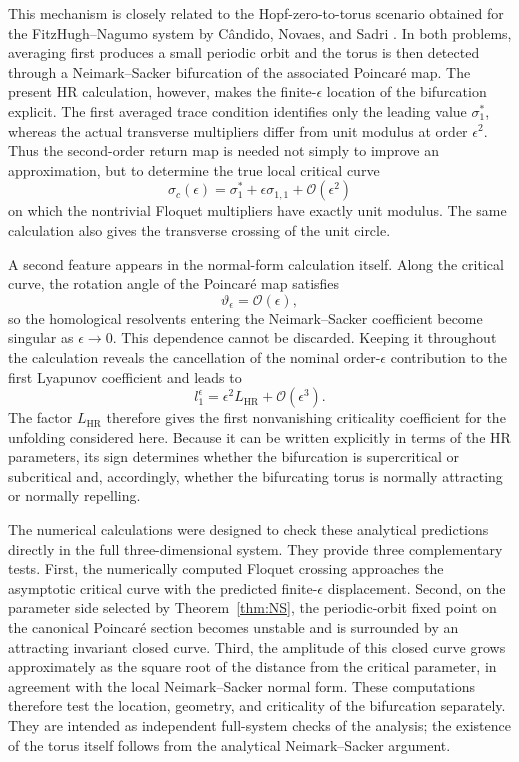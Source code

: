 \documentclass[11pt]{amsart}
\theoremstyle{remark}
\begin{document}
This mechanism is closely related to the Hopf-zero-to-torus scenario
obtained for the FitzHugh--Nagumo system by C\^andido, Novaes, and
Sadri \cite{candido2027invariant}. In both problems, averaging first
produces a small periodic orbit and the torus is then detected through a
Neimark--Sacker bifurcation of the associated Poincar\'e map. The
present HR calculation, however, makes the finite-$\epsilon$ location of
the bifurcation explicit. The first averaged trace condition identifies
only the leading value $\sigma_1^*$, whereas the actual transverse
multipliers differ from unit modulus at order $\epsilon^2$. Thus the
second-order return map is needed not simply to improve an
approximation, but to determine the true local critical curve
\[
\sigma_c(\epsilon)
=
\sigma_1^*+\epsilon\sigma_{1,1}
+\mathcal{O}(\epsilon^2)
\]
on which the nontrivial Floquet multipliers have exactly unit modulus.
The same calculation also gives the transverse crossing of the unit
circle.

A second feature appears in the normal-form calculation itself. Along
the critical curve, the rotation angle of the Poincar\'e map satisfies
\[
\vartheta_\epsilon=\mathcal{O}(\epsilon),
\]
so the homological resolvents entering the Neimark--Sacker coefficient
become singular as $\epsilon\to0$. This dependence cannot be discarded.
Keeping it throughout the calculation reveals the cancellation of the
nominal order-$\epsilon$ contribution to the first Lyapunov coefficient
and leads to
\[
l_1^\epsilon
=
\epsilon^2L_{\mathrm{HR}}
+\mathcal{O}(\epsilon^3).
\]
The factor $L_{\mathrm{HR}}$ therefore gives the first nonvanishing
criticality coefficient for the unfolding considered here. Because it
can be written explicitly in terms of the HR parameters, its sign
determines whether the bifurcation is supercritical or subcritical and,
accordingly, whether the bifurcating torus is normally attracting or
normally repelling.

The numerical calculations were designed to check these analytical
predictions directly in the full three-dimensional system. They provide
three complementary tests. First, the numerically computed Floquet
crossing approaches the asymptotic critical curve with the predicted
finite-$\epsilon$ displacement. Second, on the parameter side selected
by Theorem~\ref{thm:NS}, the periodic-orbit fixed point on the canonical
Poincar\'e section becomes unstable and is surrounded by an attracting
invariant closed curve. Third, the amplitude of this closed curve grows
approximately as the square root of the distance from the critical
parameter, in agreement with the local Neimark--Sacker normal form.
These computations therefore test the location, geometry, and
criticality of the bifurcation separately. They are intended as
independent full-system checks of the analysis; the existence of the
torus itself follows from the analytical Neimark--Sacker argument.
\end{document}
